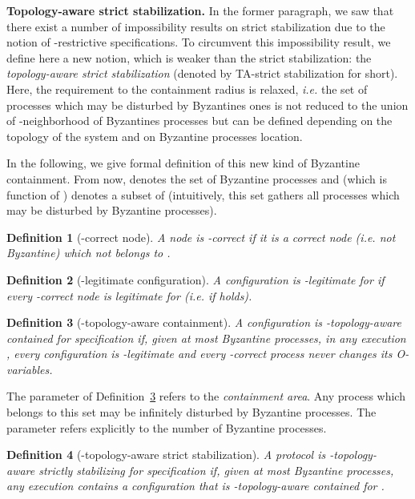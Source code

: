 \documentclass[11pt]{article}
\newtheorem{defi}{Definition}
\newenvironment{definition}[1]{\vspace{-0.25cm}\begin{defi}#1}{\end{defi}\vspace{-0.3cm}}
\begin{document}
\noindent\textbf{Topology-aware strict stabilization.} In the former paragraph, we saw that there exist a number of impossibility results on strict stabilization due to the notion of -restrictive specifications. To circumvent this impossibility result, we define here a new notion, which is weaker than the strict stabilization: the \emph{topology-aware strict stabilization} (denoted by TA-strict stabilization for short). Here, the requirement to the containment radius is relaxed, \emph{i.e.} the set of processes which may be disturbed by Byzantines ones is not reduced to the union of -neighborhood of Byzantines processes but can be defined depending on the topology of the system and on Byzantine processes location.

In the following, we give formal definition of this new kind of Byzantine containment. From now,  denotes the set of Byzantine processes and  (which is function of ) denotes a subset of  (intuitively, this set gathers all processes which may be disturbed by Byzantine processes).

\begin{definition}[-correct node]
A node is \emph{-correct} if it is a correct node (\emph{i.e.} not Byzantine) which not belongs to .
\end{definition}

\begin{definition}[-legitimate configuration]
A configuration  is \emph{-legitimate} for  if every -correct node  is legitimate for  (\emph{i.e.} if  holds).
\end{definition}

\begin{definition}[-topology-aware containment]
\label{def:SfTAcontained}
A configuration  is \emph{-topology-aware contained} for specification  if, given at most  Byzantine processes, in any execution , every configuration is -legitimate and every -correct process never changes its O-variables. 
\end{definition}

The parameter  of Definition~\ref{def:SfTAcontained} refers to the \emph{containment area}. Any process which belongs to this set may be infinitely disturbed by Byzantine processes. The parameter  refers explicitly to the number of Byzantine processes.

\begin{definition}[-topology-aware strict stabilization]
\label{def:SfTAStrictstabilizing}
A protocol is \emph{-topology-\\\noindent aware strictly stabilizing} for specification  if, given at most  Byzantine processes, any execution  contains a configuration  that is -topology-aware contained for .
\end{definition}
\end{document}
